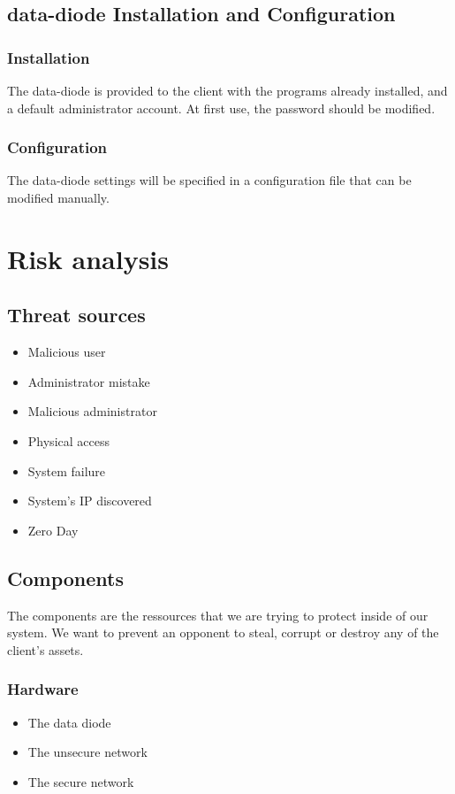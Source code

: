 \documentclass[a4paper,11pt]{article}
\begin{document}
\subsection{data-diode Installation and Configuration}

\subsubsection{Installation}
The data-diode is provided to the client with the programs already installed, and a default administrator account. At first use, the password should be modified.

\subsubsection{Configuration}
The data-diode settings will be specified in a configuration file that can be modified manually.

\section{Risk analysis}
\subsection{Threat sources}
\begin{itemize}
\item Malicious user
\item Administrator mistake
\item Malicious administrator
\item Physical access
\item System failure
\item System's IP discovered
\item Zero Day
\end{itemize}
\subsection{Components}
The components are the ressources that we are trying to protect inside of our system. We want to prevent an opponent to steal, corrupt or destroy any of the client's assets.
\subsubsection{Hardware}
\begin{itemize}
\item The data diode
\item The unsecure network
\item The secure network
\end{itemize}
\end{document}
